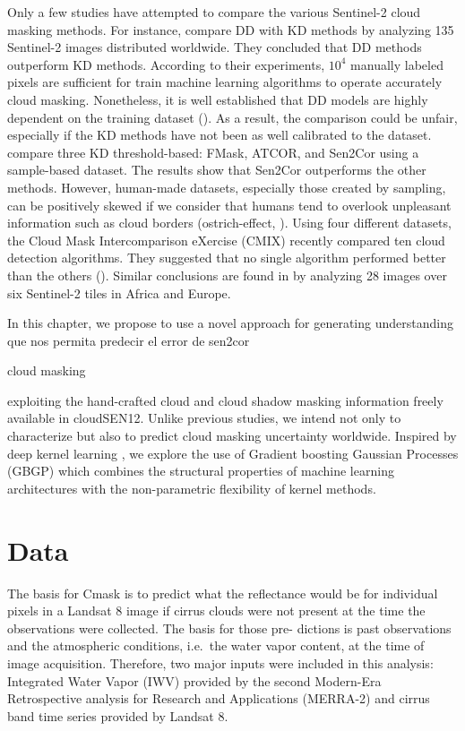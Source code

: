 \documentclass[a4paper, nobind]{templates/cdethesis}
\begin{document}
Only a few studies have attempted to compare the various Sentinel-2 cloud masking methods. For instance, \cite{Cilli} compare DD with KD methods by analyzing 135 Sentinel-2 images distributed worldwide. They concluded that DD methods outperform KD methods. According to their experiments, \(10^{4}\) manually labeled pixels are sufficient for train machine learning algorithms to operate accurately cloud masking. Nonetheless, it is well established that DD models are highly dependent on the training dataset (\cite{Lopez-Puigdollers2021}). As a result, the comparison could be unfair, especially if the KD methods have not been as well calibrated to the dataset. \cite{Zekoll2021} compare three KD threshold-based: FMask, ATCOR, and Sen2Cor using a sample-based dataset. The results show that Sen2Cor outperforms the other methods. However, human-made datasets, especially those created by sampling, can be positively skewed if we consider that humans tend to overlook unpleasant information such as cloud borders (ostrich-effect, \cite{Valdez2017}). Using four different datasets, the Cloud Mask Intercomparison eXercise (CMIX) recently compared ten cloud detection algorithms. They suggested that no single algorithm performed better than the others (\cite{skakun2022cloud}). Similar conclusions are found in \cite{tarrio2020comparison} by analyzing 28 images over six Sentinel-2 tiles in Africa and Europe.

In this chapter, we propose to use a novel approach for
generating understanding
que nos permita predecir el error de sen2cor

cloud masking

exploiting the hand-crafted cloud and cloud shadow masking information freely available in cloudSEN12. Unlike previous studies, we intend not only to characterize but also to predict cloud masking uncertainty worldwide. Inspired by deep kernel learning \cite{wilson2016deep}, we explore the use of Gradient boosting Gaussian Processes (GBGP) which combines the structural properties of machine learning architectures with the non-parametric flexibility of kernel methods.

\hypertarget{data}{%
\section{Data}\label{data}}

The basis for Cmask is to predict what the reflectance would be for individual pixels in a Landsat 8 image if cirrus clouds were not present at the time the observations were collected. The basis for those pre- dictions is past observations and the atmospheric conditions, i.e.~the water vapor content, at the time of image acquisition. Therefore, two major inputs were included in this analysis: Integrated Water Vapor (IWV) provided by the second Modern-Era Retrospective analysis for Research and Applications (MERRA-2) and cirrus band time series provided by Landsat 8.
\end{document}
